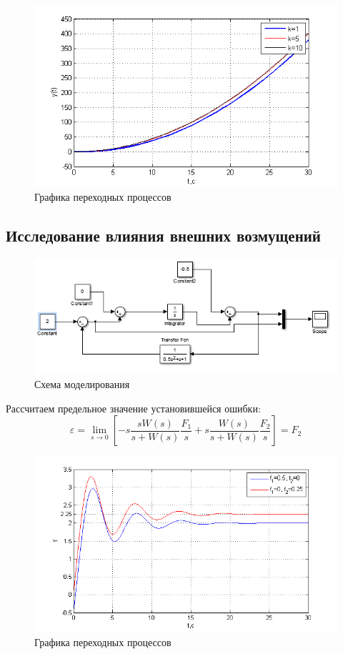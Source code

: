 \documentclass[a4paper, 10pt]{article}
\begin{document}
\begin{center}
	\begin{figure}[h]
		\centering
		\includegraphics[width=0.7\linewidth]{8}
		\caption{Графика переходных процессов }
		\label{fig:8}
	\end{figure}
\end{center}
\clearpage
\begin{center}
	\section{Исследование влияния внешних возмущений}\hfill\par
\end{center}
\begin{figure}[h]
	\centering
	\includegraphics[width=0.7\linewidth]{9}
	\caption{Схема моделирования}
	\label{fig:9}
\end{figure}
Рассчитаем предельное значение установившейся ошибки:
\begin{equation}
\varepsilon  = \mathop {\lim }\limits_{s \to 0} [ - s\frac{{sW(s)}}{{s + W(s)}}\frac{{{F_1}}}{s} + s\frac{{W(s)}}{{s + W(s)}}\frac{{{F_2}}}{s}] = {F_2}
\end{equation}
\begin{center}
	\begin{figure}[H]
		\centering
			\includegraphics[width=0.7\linewidth]{10}
		\caption{Графика переходных процессов}
		\label{fig:10}
	\end{figure}
\end{center}
\end{document}
